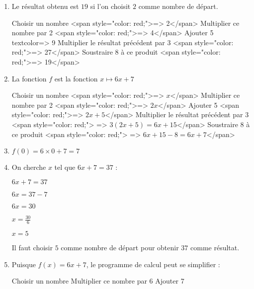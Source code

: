 \begin{corrige}
     \begin{enumerate}
          \item
          Le résultat obtenu est $19$ si l'on choisit $2$ comme nombre de départ.
          \begin{code}
   Choisir un nombre <span style="color: red;">=> 2</span>
   Multiplier ce nombre par 2 <span style="color: red;">=> 4</span>
   Ajouter 5 \\textcolor{=> 9}
   Multiplier le résultat précédent par 3 <span style="color: red;">=> 27</span>
   Soustraire 8 à ce produit <span style="color: red;">=> 19</span>
   \end{code}
          \item
          La fonction $f$ est la fonction $x \mapsto  6x+7$
          \begin{code}
   Choisir un nombre <span style="color: red;">=> $x$</span>
   Multiplier ce nombre par 2 <span style="color: red;">=> $2x$</span>
   Ajouter 5 <span style="color: red;">=> $2x+5$</span>
   Multiplier le résultat précédent par 3 <span style="color: red;">
      => $3\left(2x+5\right)=6x+15$</span>
   Soustraire 8 à ce produit <span style="color: red;">
      => $6x+15-8=6x+7$</span>
          \end{code}
          \item
          $f\left(0\right)=6\times 0+7=7$
          \item
          On cherche $x$ tel que $6x+7=37$ :
          \par
          $6x+7=37$
          \par
          $6x=37-7$
          \par
          $6x=30$
          \par
          $x=\frac{30}{6}$
          \par
          $x=5$
          \par
          Il faut choisir $5$ comme nombre de départ pour obtenir $37$ comme résultat.
          \item
          Puisque $f\left(x\right)=6x+7$, le programme de calcul peut se simplifier :
          \begin{code}
   Choisir un nombre
   Multiplier ce nombre par 6
   Ajouter 7
          \end{code}
     \end{enumerate}
\end{corrige}
